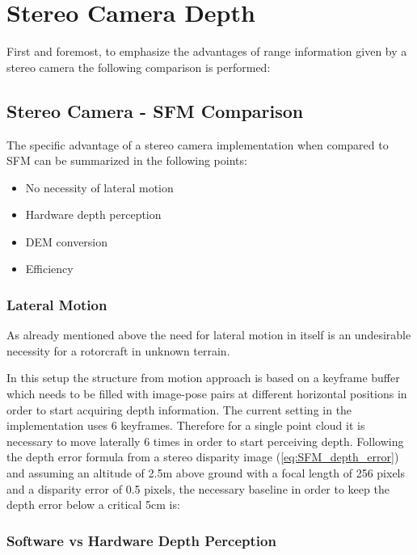 \chapter{Stereo Camera Depth}
\label{chapter:stereo_camera_depth}

First and foremost, to emphasize the advantages of range information given by a stereo camera the following comparison is performed:

\section{Stereo Camera - SFM Comparison}

The specific advantage of a stereo camera implementation when compared to SFM can be summarized in the following points:

\begin{itemize}
    \item No necessity of lateral motion
    \item Hardware depth perception
    \item DEM conversion
    \item Efficiency
\end{itemize}

\subsection{Lateral Motion}

As already mentioned above the need for lateral motion in itself is an undesirable necessity for a rotorcraft in unknown terrain. 

In this setup the structure from motion approach is based on a keyframe buffer which needs to be filled with image-pose pairs at different horizontal positions in order to start acquiring depth information. The current setting in the implementation \citet{SFM} uses 6 keyframes. Therefore for a single point cloud it is necessary to move laterally 6 times in order to start perceiving depth. Following the depth error formula from a stereo disparity image (\ref{eq:SFM_depth_error}) and assuming an altitude of 2.5m above ground with a focal length of 256 pixels and a disparity error of 0.5 pixels, the necessary baseline in order to keep the depth error below a critical 5cm is:

\subsection{Software vs Hardware Depth Perception}


